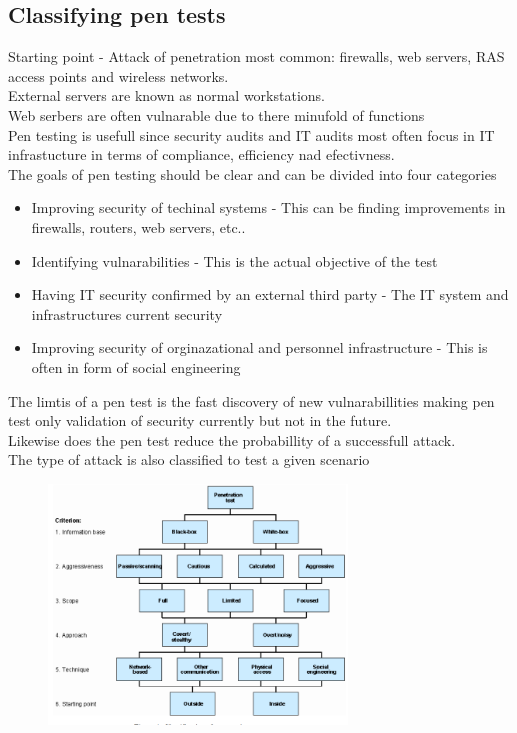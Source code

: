 \documentclass[12pt, a4paper]{article}
\begin{document}
		\subsection{Classifying pen tests}
			Starting point - Attack of penetration most common: firewalls, web servers, RAS access points and wireless networks.\\
			External servers are known as normal workstations.\\
			Web serbers are often vulnarable due to there minufold of functions\\
			Pen testing is usefull since security audits and IT audits most often focus in IT infrastucture in terms of compliance, efficiency nad efectivness.\\
			The goals of pen testing should be clear and can be divided into four categories\\
			\begin{itemize}
				\item Improving security of techinal systems - This can be finding improvements in firewalls, routers, web servers, etc..
				\item Identifying vulnarabilities - This is the actual objective of the test
				\item Having IT security confirmed by an external third party - The IT system and infrastructures current security
				\item Improving security of orginazational and personnel infrastructure - This is often in form of social engineering
			\end{itemize}
			The limtis of a pen test is the fast discovery of new vulnarabillities making pen test only validation of security currently but not in the future.\\
			Likewise does the pen test reduce the probabillity of a successfull attack.\\
			The type of attack is also classified to test a given scenario\\
			\begin{figure}[h!]
				\centering
				\includegraphics[width=300px]{assets/penClassification.png}
			\end{figure}
\end{document}
